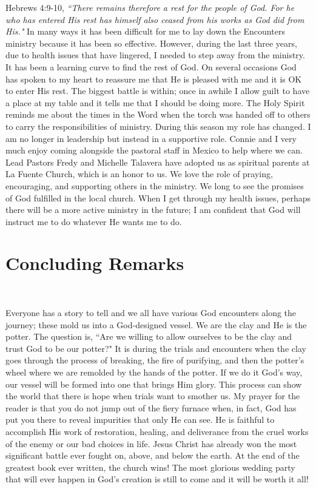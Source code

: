 \documentclass[oneside,12pt]{book}
\begin{document}
Hebrews 4:9-10, \textit{``There remains therefore a rest for the people of God. For he who has entered His rest has himself also ceased from his works as God did from His."} In many ways it has been difficult for me to lay down the Encounters ministry because it has been so effective. However, during the last three years, due to health issues that have lingered, I needed to step away from the ministry. It has been a learning curve to find the rest of God. On several occasions God has spoken to my heart to reassure me that He is pleased with me and it is OK to enter His rest. The biggest battle is within; once in awhile I allow guilt to have a place at my table and it tells me that I should be doing more. The Holy Spirit reminds me about the times in the Word when the torch was handed off to others to carry the responsibilities of ministry. During this season my role has changed. I am no longer in leadership but instead in a supportive role. Connie and I very much enjoy coming alongside the pastoral staff in Mexico to help where we can. Lead Pastors Fredy and Michelle Talavera have adopted us as spiritual parents at La Fuente Church, which is an honor to us. We love the role of praying, encouraging, and supporting others in the ministry. We long to see the promises of God fulfilled in the local church. When I get through my health issues, perhaps there will be a more active ministry in the future; I am confident that God will instruct me to do whatever He wants me to do.


\section{Concluding Remarks}
\

Everyone has a story to tell and we all have various God encounters along the journey; these mold us into a God-designed vessel. We are the clay and He is the potter. The question is, ``Are we willing to allow ourselves to be the clay and trust God to be our potter?" It is during the trials and encounters when the clay goes through the process of breaking, the fire of purifying, and then the potter's wheel where we are remolded by the hands of the potter. If we do it God's way, our vessel will be formed into one that brings Him glory. This process can show the world that there is hope when trials want to smother us. My prayer for the reader is that you do not jump out of the fiery furnace when, in fact, God has put you there to reveal impurities that only He can see. He is faithful to accomplish His work of restoration, healing, and deliverance from the cruel works of the enemy or our bad choices in life. Jesus Christ has already won the most significant battle ever fought on, above, and below the earth. At the end of the greatest book ever written, the church wins! The most glorious wedding party that will ever happen in God's creation is still to come and it will be worth it all! 
\end{document}
